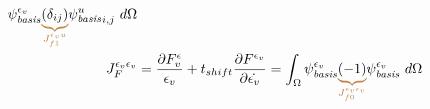 \documentclass[aspectratio=169,hyperref=colorlinks]{beamer}
\begin{document}
\begin{frame}
{\begin{minipage}{\linewidth}
\begin{align*}
\basisscalar[\epsilon_{v}] \eqnannotatemat{\left(\delta_{ij}\right)}{J_{f1}^{\epsilon_{v}u}}
\basisscalar[u]_{i,j} \ d\Omega\\
%
%
%
%
J_F^{\epsilon_{v}\epsilon_{v}} &= \frac{\partial F^\epsilon_{v}}{\epsilon_{v}} + t_{shift} \frac{\partial F^{\epsilon_{v}}}{\partial \dot{\epsilon_{v}}} =
\int_{\Omega} \basisscalar[\epsilon_{v}] \eqnannotatemat{\left(-1\right)}{J_{f0}^{\epsilon_{v}\epsilon_{v}}} \basisscalar[\epsilon_{v}] \ d\Omega
\end{align*}
  \end{minipage}
}
\end{frame}
\end{document}
